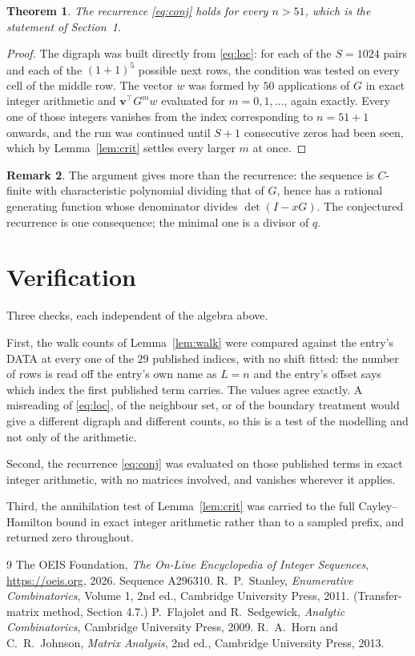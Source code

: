 \documentclass[11pt,a4paper]{article}
\theoremstyle{plain}
\newtheorem{theorem}{Theorem}
\theoremstyle{definition}
\newtheorem{remark}[theorem]{Remark}
\begin{document}
\begin{theorem}
The recurrence \eqref{eq:conj} holds for every $n>51$, which is the statement of
Section~1.
\end{theorem}

\begin{proof}
The digraph was built directly from \eqref{eq:loc}: for each of the $S=1024$ pairs and each
of the $(1+1)^{5}$ possible next rows, the condition was tested on every cell of
the middle row. The vector $w$ was formed by $50$ applications of $G$ in exact integer
arithmetic and $\mathbf{v}^{\!\top}G^{m}w$ evaluated for $m=0,1,\dots$, again exactly.
Every one of those integers vanishes from the index corresponding to $n=51+1$ onwards,
and the run was continued until $S+1$ consecutive zeros had been seen, which by
Lemma~\ref{lem:crit} settles every larger $m$ at once.
\end{proof}

\begin{remark}
The argument gives more than the recurrence: the sequence is $C$-finite with characteristic
polynomial dividing that of $G$, hence has a rational generating function whose denominator
divides $\det(I-xG)$. The conjectured recurrence is one consequence; the minimal one is a
divisor of $q$.
\end{remark}

\section{Verification}

Three checks, each independent of the algebra above.

First, the walk counts of Lemma~\ref{lem:walk} were compared against the entry's DATA at
every one of the $29$ published indices, with no shift fitted: the number of rows is
read off the entry's own name as $L=n$ and the entry's offset says which index the first
published term carries. The values agree exactly. A misreading of \eqref{eq:loc}, of the
neighbour set, or of the boundary treatment would give a different digraph and different
counts, so this is a test of the modelling and not only of the arithmetic.

Second, the recurrence \eqref{eq:conj} was evaluated on those published terms in exact
integer arithmetic, with no matrices involved, and vanishes wherever it applies.

Third, the annihilation test of Lemma~\ref{lem:crit} was carried to the full
Cayley--Hamilton bound in exact integer arithmetic rather than to a sampled prefix, and
returned zero throughout.

\begin{thebibliography}{9}
 The OEIS Foundation, \emph{The On-Line Encyclopedia of Integer
Sequences}, \url{https://oeis.org}, 2026. Sequence A296310.
 R.~P.~Stanley, \emph{Enumerative Combinatorics}, Volume 1, 2nd ed.,
Cambridge University Press, 2011. (Transfer-matrix method, Section 4.7.)
 P.~Flajolet and R.~Sedgewick, \emph{Analytic Combinatorics}, Cambridge
University Press, 2009.
 R.~A.~Horn and C.~R.~Johnson, \emph{Matrix Analysis}, 2nd ed., Cambridge
University Press, 2013.
\end{thebibliography}
\end{document}
